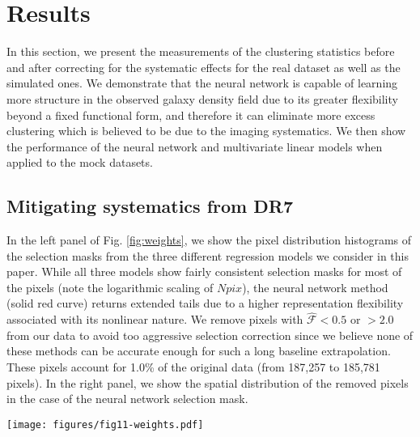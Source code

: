 %
%
\section{Results}\label{sec:results}
In this section, we present the measurements of the clustering statistics before and after correcting for the systematic effects for the real dataset as well as the simulated ones. We demonstrate that the neural network is capable of learning more structure in the observed galaxy density field due to its greater flexibility beyond a fixed functional form, and therefore it can eliminate more excess clustering which is believed to be due to the imaging systematics. We then show the performance of the neural network and multivariate linear models when applied to the mock datasets.

\subsection{Mitigating systematics from DR7}
\label{sec:mitigateDR7}
In the left panel of Fig. \ref{fig:weights}, we show the pixel distribution histograms of the selection masks from the three different regression models we consider in this paper. While all three models show fairly consistent selection masks for most of the pixels (note the logarithmic scaling of $Npix$), the neural network method (solid red curve) returns extended tails due to a higher representation flexibility associated with its nonlinear nature. We remove pixels with $\hat{\mathcal{F}} < 0.5$ or $> 2.0$ from our data to avoid too aggressive selection correction since we believe none of these methods can be accurate enough for such a long baseline extrapolation. These pixels account for 1.0\% of the original data (from 187,257 to 185,781 pixels). In the right panel, we show the spatial distribution of the removed pixels in the case of the neural network selection mask. \\

\begin{figure*}
    \centering
    \texttt{[image: figures/fig11-weights.pdf]}
    \caption{The pixel distribution  of  the  selection  masks for DR7. \textit{Left}: Distribution of the selection masks (i.e., estimates of the contamination model) derived from different regression models. \textit{Right}: Spatial scatter of the pixels we remove from our data due to the extreme values of the neural network selection mask.}
    \label{fig:weights}
\end{figure*}


